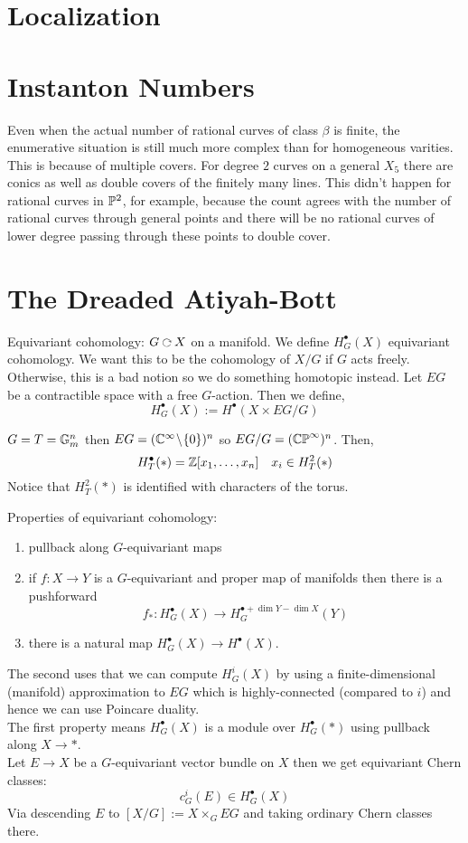 \documentclass[12pt]{article}
\begin{document}
\section{Localization}


\section{Instanton Numbers}

Even when the actual number of rational curves of class $\beta$ is finite, the enumerative situation is still much more complex than for homogeneous varities. This is because of multiple covers. For degree $2$ curves on a general $X_5$ there are conics as well as double covers of the finitely many lines. This didn't happen for rational curves in $\P^2$, for example, because the count agrees with the number of rational curves through general points and there will be no rational curves of lower degree passing through these points to double cover. 

\section{The Dreaded Atiyah-Bott}

Equivariant cohomology: $G \acts X$ on a manifold. We define $H^\bullet_G(X)$ equivariant cohomology. We want this to be the cohomology of $X/G$ if $G$ acts freely. Otherwise, this is a bad notion so we do something homotopic instead. Let $EG$ be a contractible space with a free $G$-action. Then we define,
\[ H_G^\bullet(X) := H^\bullet(X \times EG / G) \]

\begin{example}
$G = T = \Gm^n$ then $EG = (\CC^{\infty} \sm \{ 0 \})^n$ so $EG/G = (\CP^{\infty})^n$. Then,
\[ H^\bullet_T(*) = \Z [x_1, \dots, x_n] \quad x_i \in H^2_T(*) \]
Notice that $H^2_T(*)$ is identified with characters of the torus. 
\end{example}

Properties of equivariant cohomology:
\begin{enumerate}
\item pullback along $G$-equivariant maps
\item if $f : X \to Y$ is a $G$-equivariant and proper map of manifolds then there is a pushforward
\[ f_* : H^\bullet_G(X) \to H^{\bullet + \dim{Y} - \dim{X}}_G(Y) \]
\item there is a natural map $H^\bullet_G(X) \to H^\bullet(X)$.
\end{enumerate}
The second uses that we can compute $H^i_G(X)$ by using a finite-dimensional (manifold) approximation to $EG$ which is highly-connected (compared to $i$) and hence we can use Poincare duality.
\bigskip\\
The first property means $H^\bullet_G(X)$ is a module over $H_G^\bullet(*)$ using pullback along $X \to *$. 
\bigskip\\
Let $E \to X$ be a $G$-equivariant vector bundle on $X$ then we get equivariant Chern classes:
\[ c^i_G(E) \in H_G^\bullet(X) \]
Via descending $E$ to $[X / G] := X \times_G EG$ and taking ordinary Chern classes there. 
\end{document}
